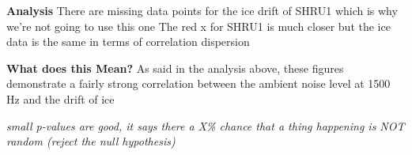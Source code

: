 \textbf{Analysis}
There are missing data points for the ice drift of SHRU1 which is why we’re not going to use this one
The red x for SHRU1 is much closer but the ice data is the same in terms of correlation dispersion

\textbf{What does this Mean?}
As said in the analysis above, these figures demonstrate a fairly strong correlation between the ambient noise level at 1500 Hz and the drift of ice

\textit{small p-values are good, it says there a X\% chance that a thing happening is NOT random (reject the null hypothesis)}